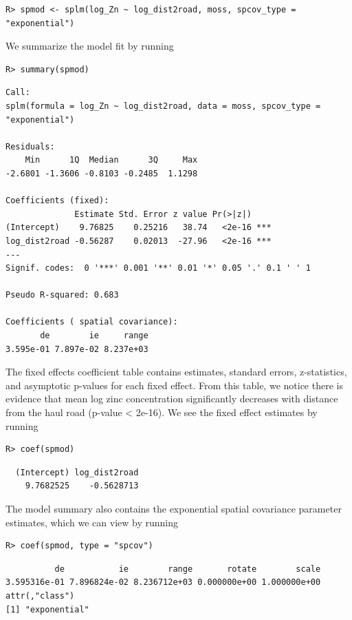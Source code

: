 \documentclass[10pt,letterpaper]{article}
\begin{document}
\begin{verbatim}
R> spmod <- splm(log_Zn ~ log_dist2road, moss, spcov_type = "exponential")
\end{verbatim}

We summarize the model fit by running

\begin{verbatim}
R> summary(spmod)
\end{verbatim}

\begin{verbatim}
Call:
splm(formula = log_Zn ~ log_dist2road, data = moss, spcov_type = "exponential")

Residuals:
    Min      1Q  Median      3Q     Max 
-2.6801 -1.3606 -0.8103 -0.2485  1.1298 

Coefficients (fixed):
              Estimate Std. Error z value Pr(>|z|)    
(Intercept)    9.76825    0.25216   38.74   <2e-16 ***
log_dist2road -0.56287    0.02013  -27.96   <2e-16 ***
---
Signif. codes:  0 '***' 0.001 '**' 0.01 '*' 0.05 '.' 0.1 ' ' 1

Pseudo R-squared: 0.683

Coefficients ( spatial covariance):
       de        ie     range 
3.595e-01 7.897e-02 8.237e+03 
\end{verbatim}

The fixed effects coefficient table contains estimates, standard errors,
z-statistics, and asymptotic p-values for each fixed effect. From this
table, we notice there is evidence that mean log zinc concentration
significantly decreases with distance from the haul road (p-value
\textless{} 2e-16). We see the fixed effect estimates by running

\begin{verbatim}
R> coef(spmod)
\end{verbatim}

\begin{verbatim}
  (Intercept) log_dist2road 
    9.7682525    -0.5628713 
\end{verbatim}

The model summary also contains the exponential spatial covariance
parameter estimates, which we can view by running

\begin{verbatim}
R> coef(spmod, type = "spcov")
\end{verbatim}

\begin{verbatim}
          de           ie        range       rotate        scale 
3.595316e-01 7.896824e-02 8.236712e+03 0.000000e+00 1.000000e+00 
attr(,"class")
[1] "exponential"
\end{verbatim}
\end{document}
